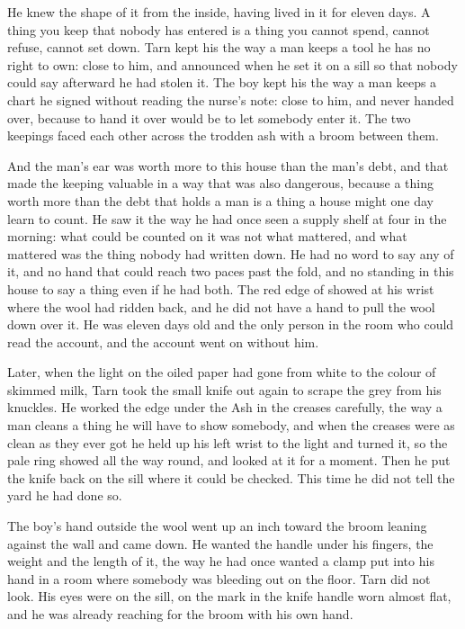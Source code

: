 He knew the shape of it from the inside, having lived in it for eleven days. A thing you keep that nobody has entered is a thing you cannot spend, cannot refuse, cannot set down. Tarn kept his the way a man keeps a tool he has no right to own: close to him, and announced when he set it on a sill so that nobody could say afterward he had stolen it. The boy kept his the way a man keeps a chart he signed without reading the nurse's note: close to him, and never handed over, because to hand it over would be to let somebody enter it. The two keepings faced each other across the trodden ash with a broom between them.

And the man's ear was worth more to this house than the man's debt, and that made the keeping valuable in a way that was also dangerous, because a thing worth more than the debt that holds a man is a thing a house might one day learn to count. He saw it the way he had once seen a supply shelf at four in the morning: what could be counted on it was not what mattered, and what mattered was the thing nobody had written down. He had no word to say any of it, and no hand that could reach two paces past the fold, and no standing in this house to say a thing even if he had both. The red edge of  showed at his wrist where the wool had ridden back, and he did not have a hand to pull the wool down over it. He was eleven days old and the only person in the room who could read the account, and the account went on without him.

\scenebreak

Later, when the light on the oiled paper had gone from white to the colour of skimmed milk, Tarn took the small knife out again to scrape the grey from his knuckles. He worked the edge under the Ash in the creases carefully, the way a man cleans a thing he will have to show somebody, and when the creases were as clean as they ever got he held up his left wrist to the light and turned it, so the pale ring showed all the way round, and looked at it for a moment. Then he put the knife back on the sill where it could be checked. This time he did not tell the yard he had done so.

The boy's hand outside the wool went up an inch toward the broom leaning against the wall and came down. He wanted the handle under his fingers, the weight and the length of it, the way he had once wanted a clamp put into his hand in a room where somebody was bleeding out on the floor. Tarn did not look. His eyes were on the sill, on the mark in the knife handle worn almost flat, and he was already reaching for the broom with his own hand.

